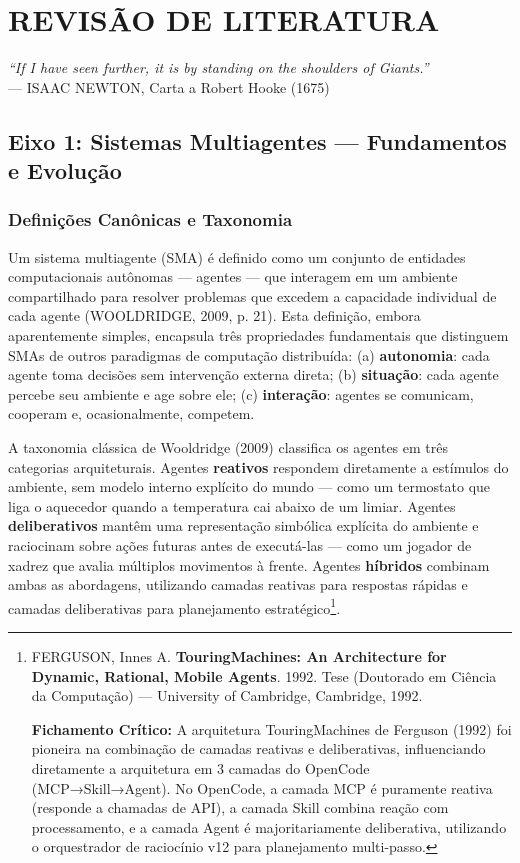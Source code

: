 
\chapter{REVISÃO DE LITERATURA}
\label{ch:revisao}

\begin{flushright}
\small\textit{``If I have seen further, it is by standing on the shoulders of Giants.''}\\
--- ISAAC NEWTON, Carta a Robert Hooke (1675)
\end{flushright}

\section{Eixo 1: Sistemas Multiagentes — Fundamentos e Evolução}

\subsection{Definições Canônicas e Taxonomia}

Um sistema multiagente (SMA) é definido como um conjunto de entidades computacionais autônomas --- agentes --- que interagem em um ambiente compartilhado para resolver problemas que excedem a capacidade individual de cada agente (WOOLDRIDGE, 2009, p. 21). Esta definição, embora aparentemente simples, encapsula três propriedades fundamentais que distinguem SMAs de outros paradigmas de computação distribuída: (a) \textbf{autonomia}: cada agente toma decisões sem intervenção externa direta; (b) \textbf{situação}: cada agente percebe seu ambiente e age sobre ele; (c) \textbf{interação}: agentes se comunicam, cooperam e, ocasionalmente, competem.

A taxonomia clássica de Wooldridge (2009) classifica os agentes em três categorias arquiteturais. Agentes \textbf{reativos} respondem diretamente a estímulos do ambiente, sem modelo interno explícito do mundo --- como um termostato que liga o aquecedor quando a temperatura cai abaixo de um limiar. Agentes \textbf{deliberativos} mantêm uma representação simbólica explícita do ambiente e raciocinam sobre ações futuras antes de executá-las --- como um jogador de xadrez que avalia múltiplos movimentos à frente. Agentes \textbf{híbridos} combinam ambas as abordagens, utilizando camadas reativas para respostas rápidas e camadas deliberativas para planejamento estratégico\footnote{
  FERGUSON, Innes A. \textbf{TouringMachines: An Architecture for Dynamic, Rational, Mobile Agents}. 1992. Tese (Doutorado em Ciência da Computação) --- University of Cambridge, Cambridge, 1992.

  \textbf{Fichamento Crítico:} A arquitetura TouringMachines de Ferguson (1992) foi pioneira na combinação de camadas reativas e deliberativas, influenciando diretamente a arquitetura em 3 camadas do OpenCode (MCP→Skill→Agent). No OpenCode, a camada MCP é puramente reativa (responde a chamadas de API), a camada Skill combina reação com processamento, e a camada Agent é majoritariamente deliberativa, utilizando o orquestrador de raciocínio v12 para planejamento multi-passo.
}.

